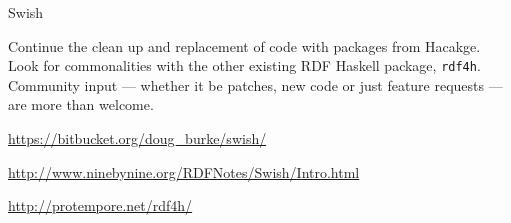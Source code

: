 \begin{hcarentry}[new]{Swish}
\FuturePlans

Continue the clean up and replacement of code with packages from
Hacakge. Look for commonalities with the other existing RDF Haskell package,
{\tt rdf4h}.
Community input --- whether it be patches, new code or just feature
requests --- are more than welcome.
 
\FurtherReading
\begin{compactitem}
\item \url{https://bitbucket.org/doug_burke/swish/}
\item \url{http://www.ninebynine.org/RDFNotes/Swish/Intro.html}
\item \url{http://protempore.net/rdf4h/}
\end{compactitem}
\end{hcarentry}
